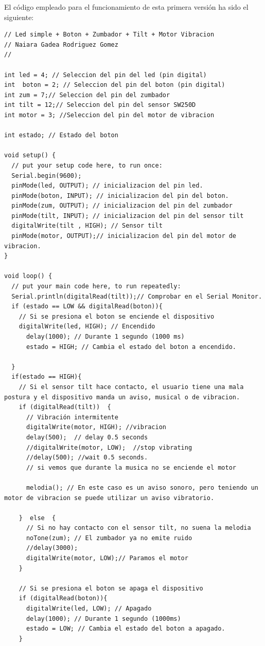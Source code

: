 \newpage
El código empleado para el funcionamiento de esta primera versión ha sido el siguiente:
\begin{lstlisting}
// Led simple + Boton + Zumbador + Tilt + Motor Vibracion
// Naiara Gadea Rodriguez Gomez
// 

int led = 4; // Seleccion del pin del led (pin digital)
int  boton = 2; // Seleccion del pin del boton (pin digital)
int zum = 7;// Seleccion del pin del zumbador
int tilt = 12;// Seleccion del pin del sensor SW250D
int motor = 3; //Seleccion del pin del motor de vibracion

int estado; // Estado del boton

void setup() {
  // put your setup code here, to run once:
  Serial.begin(9600);
  pinMode(led, OUTPUT); // inicializacion del pin led.
  pinMode(boton, INPUT); // inicializacion del pin del boton.
  pinMode(zum, OUTPUT); // inicializacion del pin del zumbador
  pinMode(tilt, INPUT); // inicializacion del pin del sensor tilt
  digitalWrite(tilt , HIGH); // Sensor tilt 
  pinMode(motor, OUTPUT);// inicializacion del pin del motor de vibracion.
}

void loop() {
  // put your main code here, to run repeatedly:
  Serial.println(digitalRead(tilt));// Comprobar en el Serial Monitor.
  if (estado == LOW && digitalRead(boton)){
    // Si se presiona el boton se enciende el dispositivo
    digitalWrite(led, HIGH); // Encendido
      delay(1000); // Durante 1 segundo (1000 ms)
      estado = HIGH; // Cambia el estado del boton a encendido.
    
  }
  if(estado == HIGH){
    // Si el sensor tilt hace contacto, el usuario tiene una mala postura y el dispositivo manda un aviso, musical o de vibracion.
    if (digitalRead(tilt))  {
      // Vibración intermitente
      digitalWrite(motor, HIGH); //vibracion
      delay(500);  // delay 0.5 seconds
      //digitalWrite(motor, LOW);  //stop vibrating
      //delay(500); //wait 0.5 seconds.
      // si vemos que durante la musica no se enciende el motor
      
      melodia(); // En este caso es un aviso sonoro, pero teniendo un motor de vibracion se puede utilizar un aviso vibratorio.
      
    }  else  {
      // Si no hay contacto con el sensor tilt, no suena la melodia
      noTone(zum); // El zumbador ya no emite ruido
      //delay(3000);
      digitalWrite(motor, LOW);// Paramos el motor
    }

    // Si se presiona el boton se apaga el dispositivo
    if (digitalRead(boton)){
      digitalWrite(led, LOW); // Apagado
      delay(1000); // Durante 1 segundo (1000ms)
      estado = LOW; // Cambia el estado del boton a apagado.
    }
    

\end{lstlisting}
